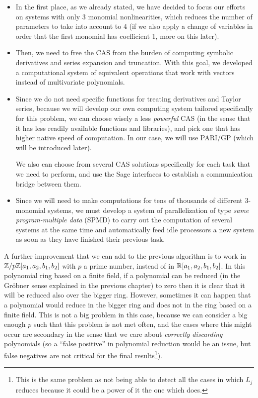 \begin{itemize}
\item
In the first place, as we already stated, we have decided to focus our efforts on systems with only 3 monomial nonlinearities, which reduces the number of parameters to take into account to 4 (if we also apply a change of variables in order that the first monomial has coefficient 1, more on this later).
\item
Then, we need to free the CAS from the burden of computing symbolic derivatives and series expansion and truncation. With this goal, we developed a computational system of equivalent operations that work with vectors instead of multivariate polynomials.
\item
Since we do not need specific functions for treating derivatives and Taylor series, because we will develop our own computing system tailored specifically for this problem, we can choose wisely a less \emph{powerful} CAS (in the sense that it has less readily available functions and libraries), and pick one that has higher native speed of computation. In our case, we will use PARI/GP (which will be introduced later).

We also can choose from several CAS solutions specifically for each task that we need to perform, and use the Sage interfaces to establish a communication bridge between them.
\item
Since we will need to make computations for tens of thousands of different 3-monomial systems, we must develop a system of parallelization of type \emph{same program-multiple data} (SPMD) to carry out the computation of several systems at the same time and automatically feed idle processors a new system as soon as they have finished their previous task.
\end{itemize}

\begin{observacio}
A further improvement that we can add to the previous algorithm is to work in $\mathbb{Z}/p\mathbb{Z}[a_1,a_2,b_1,b_2]$ with $p$ a prime number, instead of in $\mathbb{R}[a_1,a_2,b_1,b_2]$. In this polynomial ring based on a finite field, if a polynomial can be reduced (in the Gröbner sense explained in the previous chapter) to zero then it is clear that it will be reduced also over the bigger ring. However, sometimes it can happen that a polynomial would reduce in the bigger ring and does not in the ring based on a finite field. This is not a big problem in this case, because we can consider a big enough $p$ such that this problem is not met often, and the cases where this might occur are secondary in the sense that we care about \emph{correctly discarding} polynomials (so a ``false positive'' in polynomial reduction would be an issue, but false negatives are not critical for the final results\footnote{This is the same problem as not being able to detect all the cases in which $L_j$ reduces because it could be a power of it the one which does.}).
\end{observacio}

